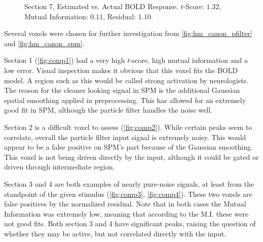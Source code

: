 \begin{figure}
\centering
{}
\caption[Time Series Comparison, Section 7]{Section 7, Estimated vs. Actual \ac{BOLD} Response. $t$-Score: $1.32$, Mutual Information: $0.11$, Residual: $1.10$.}
\label{fig:comp7}
\end{figure}

Several voxels were chosen for further investigation from \autoref{fig:hm_canon_pfilter} and \autoref{fig:hm_canon_spm}.

Section 1 (\autoref{fig:comp1}) had a very high $t$-score, high mutual information and
a low error. Visual inspection makes it obvious that this voxel fits the \ac{BOLD} model. A region
such as this would be called strong activation by neurologists. The
reason for the cleaner looking signal in \ac{SPM} is the additional Gaussian spatial smoothing
applied in preprocessing. This
has allowed for an extremely good fit in \ac{SPM}, although the particle filter handles the noise
well.

Section 2 is a difficult voxel to assess (\autoref{fig:comp2}).
While certain peaks seem to correlate, overall
the particle filter input signal is extremely noisy.
This would appear to be a false positive on \ac{SPM}'s part because of the Gaussian smoothing.
This voxel is not being driven directly by the input, although it
could be gated or driven through intermediate region.

Section 3 and 4 are both examples of nearly pure-noise signals, at least from the standpoint
of the given stimulus (\autoref{fig:comp3}, \autoref{fig:comp4}).
These two voxels are false positives by the normalized residual.
Note that in both cases the Mutual Information was extremely low, meaning that
according to the M.I. these were not good fits. Both section 3 and 4 have
significant peaks, raising the question of whether they may be active,
but not correlated directly with the input.

